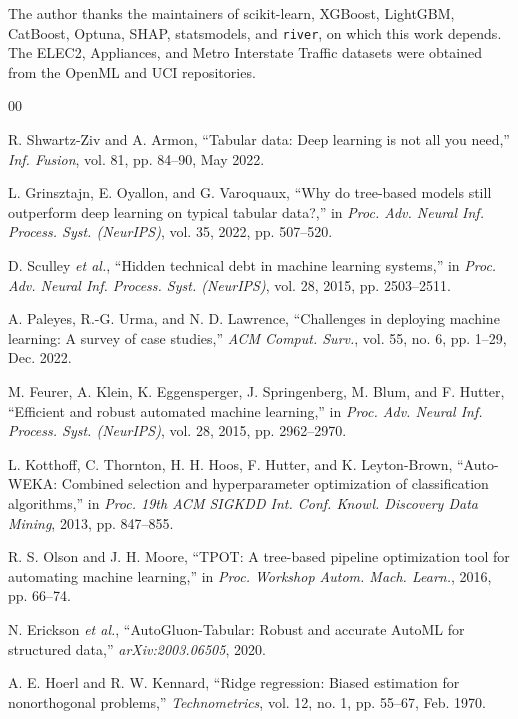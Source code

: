\documentclass{ieeeaccess}
\begin{document}
The author thanks the maintainers of scikit-learn, XGBoost, LightGBM, CatBoost, Optuna, SHAP, statsmodels, and \texttt{river}, on which this work depends. The ELEC2, Appliances, and Metro Interstate Traffic datasets were obtained from the OpenML and UCI repositories.

\begin{thebibliography}{00}

 R. Shwartz-Ziv and A. Armon, ``Tabular data: Deep learning is not all you need,'' \emph{Inf. Fusion}, vol. 81, pp. 84--90, May 2022.

 L. Grinsztajn, E. Oyallon, and G. Varoquaux, ``Why do tree-based models still outperform deep learning on typical tabular data?,'' in \emph{Proc. Adv. Neural Inf. Process. Syst. (NeurIPS)}, vol. 35, 2022, pp. 507--520.

 D. Sculley \emph{et al.}, ``Hidden technical debt in machine learning systems,'' in \emph{Proc. Adv. Neural Inf. Process. Syst. (NeurIPS)}, vol. 28, 2015, pp. 2503--2511.

 A. Paleyes, R.-G. Urma, and N. D. Lawrence, ``Challenges in deploying machine learning: A survey of case studies,'' \emph{ACM Comput. Surv.}, vol. 55, no. 6, pp. 1--29, Dec. 2022.

 M. Feurer, A. Klein, K. Eggensperger, J. Springenberg, M. Blum, and F. Hutter, ``Efficient and robust automated machine learning,'' in \emph{Proc. Adv. Neural Inf. Process. Syst. (NeurIPS)}, vol. 28, 2015, pp. 2962--2970.

 L. Kotthoff, C. Thornton, H. H. Hoos, F. Hutter, and K. Leyton-Brown, ``Auto-WEKA: Combined selection and hyperparameter optimization of classification algorithms,'' in \emph{Proc. 19th ACM SIGKDD Int. Conf. Knowl. Discovery Data Mining}, 2013, pp. 847--855.

 R. S. Olson and J. H. Moore, ``TPOT: A tree-based pipeline optimization tool for automating machine learning,'' in \emph{Proc. Workshop Autom. Mach. Learn.}, 2016, pp. 66--74.

 N. Erickson \emph{et al.}, ``AutoGluon-Tabular: Robust and accurate AutoML for structured data,'' \emph{arXiv:2003.06505}, 2020.

 A. E. Hoerl and R. W. Kennard, ``Ridge regression: Biased estimation for nonorthogonal problems,'' \emph{Technometrics}, vol. 12, no. 1, pp. 55--67, Feb. 1970.


\end{thebibliography}
\end{document}
